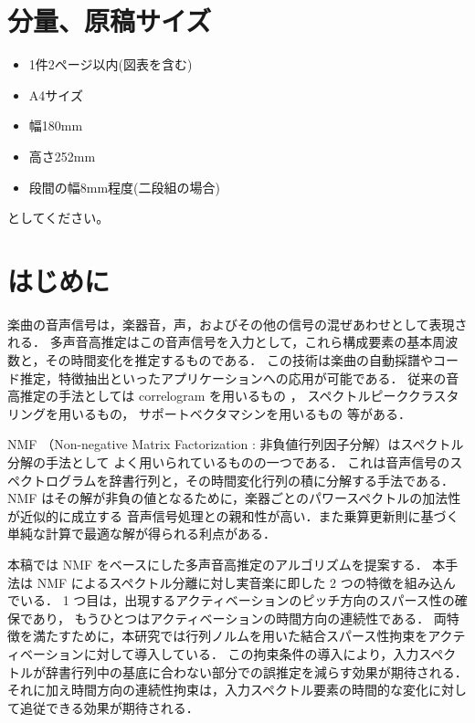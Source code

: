 \documentclass[a4paper,10pt,dvipdfmx,twocolumn]{jsarticle}
\author{
   \JEAuthor{藤沢 貴典 $^\dag$}{Takanori Fujisawa$^\dag$}{.3\hsize}
   \JEAuthor{池原 雅章$^\dag$}{Masaaki Ikehara$^\dag$}{.3\hsize}
}
\begin{document}
\pagestyle{empty}

\maketitle

\thispagestyle{empty}

\section{分量、原稿サイズ}

\begin{itemize}
\item 1件2ページ以内(図表を含む)
\item A4サイズ
\item 幅180mm
\item 高さ252mm
\item 段間の幅8mm程度(二段組の場合)
\end{itemize}
としてください。

\section{はじめに}
楽曲の音声信号は，楽器音，声，およびその他の信号の混ぜあわせとして表現される．
多声音高推定はこの音声信号を入力として，これら構成要素の基本周波数と，その時間変化を推定するものである．
この技術は楽曲の自動採譜やコード推定，特徴抽出といったアプリケーションへの応用が可能である．
従来の音高推定の手法としては correlogram を用いるもの \cite{pocsubimproved}，
スペクトルピーククラスタリングを用いるもの\cite{pertusa2008}，
サポートベクタマシンを用いるもの \cite{poliner2007} 等がある．

NMF （Non-negative Matrix Factorization : 非負値行列因子分解）はスペクトル分解の手法として
よく用いられているものの一つである．
これは音声信号のスペクトログラムを辞書行列と，その時間変化行列の積に分解する手法である．
NMF はその解が非負の値となるために，楽器ごとのパワースペクトルの加法性が近似的に成立する
音声信号処理との親和性が高い．また乗算更新則に基づく単純な計算で最適な解が得られる利点がある．

本稿では NMF をベースにした多声音高推定のアルゴリズムを提案する．
本手法は NMF によるスペクトル分離に対し実音楽に即した 2 つの特徴を組み込んでいる．
1 つ目は，出現するアクティベーションのピッチ方向のスパース性の確保であり，
もうひとつはアクティベーションの時間方向の連続性である．
両特徴を満たすために，本研究では行列ノルムを用いた結合スパース性拘束をアクティベーションに対して導入している．
この拘束条件の導入により，入力スペクトルが辞書行列中の基底に合わない部分での誤推定を減らす効果が期待される．
それに加え時間方向の連続性拘束は，入力スペクトル要素の時間的な変化に対して追従できる効果が期待される．
\end{document}

